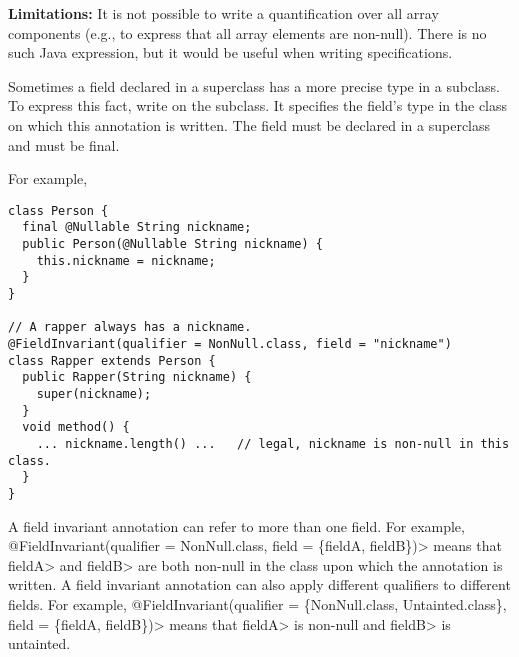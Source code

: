 

\textbf{Limitations:}
It is not possible to write a
quantification over all array components (e.g., to express that all
  array elements are non-null).  There is no such Java expression, but it
  would be useful when writing specifications.



Sometimes a field declared in a superclass has a more precise type in a
subclass.  To express this fact, write
 on the subclass. It specifies
the field's type in the class on which this annotation is written.
The field must be declared in a superclass and
must be final.


For example,
\begin{Verbatim}
class Person {
  final @Nullable String nickname;
  public Person(@Nullable String nickname) {
    this.nickname = nickname;
  }
}

// A rapper always has a nickname.
@FieldInvariant(qualifier = NonNull.class, field = "nickname")
class Rapper extends Person {
  public Rapper(String nickname) {
    super(nickname);
  }
  void method() {
    ... nickname.length() ...   // legal, nickname is non-null in this class.
  }
}
\end{Verbatim}
 A field invariant annotation can refer to more than one field. For example,
\<@FieldInvariant(qualifier = NonNull.class, field = \{fieldA, fieldB\})> means
that \<fieldA> and \<fieldB> are both non-null in the class upon which the
annotation is written.  A field invariant annotation
can also apply different qualifiers to different fields. For example,
\<@FieldInvariant(qualifier = \{NonNull.class, Untainted.class\}, field =
\{fieldA, fieldB\})> means that \<fieldA> is non-null and \<fieldB> is untainted.

